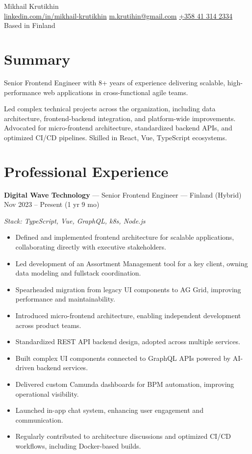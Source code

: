 \documentclass[a4paper,9pt]{article}
\begin{document}
\pagestyle{empty}

\begin{center}
    {\Huge Mikhail Krutikhin}\\
    \href{https://linkedin.com/in/mikhail-krutikhin}{linkedin.com/in/mikhail-krutikhin} \quad
    \href{mailto:m.krutihin@gmail.com}{m.krutihin@gmail.com} \quad
    \href{tel:+358413142334}{+358 41 314 2334} \quad
    Based in Finland
\end{center}

\section{Summary}
Senior Frontend Engineer with 8+ years of experience delivering scalable, high-performance web applications in cross-functional agile teams.

Led complex technical projects across the organization, including data architecture, frontend-backend integration, and platform-wide improvements. Advocated for micro-frontend architecture, standardized backend APIs, and optimized CI/CD pipelines. Skilled in React, Vue, TypeScript ecosystems.

\section{Professional Experience}

\textbf{Digital Wave Technology} --- Senior Frontend Engineer --- Finland (Hybrid) \hfill Nov 2023 -- Present (1 yr 9 mo)

\textit{Stack: TypeScript, Vue, GraphQL, k8s, Node.js}
\begin{itemize}[leftmargin=*]
  \item Defined and implemented frontend architecture for scalable applications, collaborating directly with executive stakeholders.
  \item Led development of an Assortment Management tool for a key client, owning data modeling and fullstack coordination.
  \item Spearheaded migration from legacy UI components to AG Grid, improving performance and maintainability.
  \item Introduced micro-frontend architecture, enabling independent development across product teams.
  \item Standardized REST API backend design, adopted across multiple services.
  \item Built complex UI components connected to GraphQL APIs powered by AI-driven backend services.
  \item Delivered custom Camunda dashboards for BPM automation, improving operational visibility.
  \item Launched in-app chat system, enhancing user engagement and communication.
  \item Regularly contributed to architecture discussions and optimized CI/CD workflows, including Docker-based builds.
\end{itemize}
\vspace{6pt}
\end{document}
